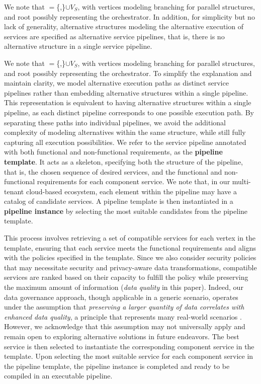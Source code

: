 \vspace{0.5em}

We note that \V$=$\{,\}$\cup$$V_S$, with vertices  modeling branching for parallel structures, and root  possibly representing the orchestrator. In addition, for simplicity but no lack of generality, alternative structures modeling the alternative execution of services are specified as alternative service pipelines, that is, there is no alternative structure in a single service pipeline.

\vspace{0.5em}
{\color{OurColor2}
We note that \V$=$\{,\}$\cup$$V_S$, with vertices  modeling branching for parallel structures, and root  possibly representing the orchestrator. To simplify the explanation and maintain clarity, we model alternative execution paths as distinct service pipelines rather than embedding alternative structures within a single pipeline. This representation is equivalent to having alternative structures within a single pipeline, as each distinct pipeline corresponds to one possible execution path. By separating these paths into individual pipelines, we avoid the additional complexity of modeling alternatives within the same structure, while still fully capturing all execution possibilities.
}
We refer to the service pipeline annotated with both functional and non-functional requirements, as the \textbf{pipeline template}. It acts as a skeleton, specifying both the structure of the pipeline, that is, the chosen sequence of desired services, and the functional and non-functional requirements for each component service. We note that, in our multi-tenant cloud-based ecosystem, each element within the pipeline may have a catalog of candidate services. A pipeline template is then instantiated in a \textbf{pipeline instance} by selecting the most suitable candidates from the pipeline template.

This process involves retrieving a set of compatible services for each vertex in the template, ensuring that each service meets the functional requirements and aligns with the policies specified in the template. Since we also consider security policies that may necessitate security and privacy-aware data transformations, compatible services are ranked based on their capacity to fulfill the policy while preserving the maximum amount of information (\emph{data quality} in this paper). Indeed, our data governance approach, though applicable in a generic scenario, operates under the assumption that \textit{preserving a larger quantity of data correlates with enhanced data quality}, {\color{OurColor2}a principle that represents many real-world scenarios \cite{PPDPasurvey,AlexInst2020}. }However, we acknowledge that this assumption may not universally apply and remain open to exploring alternative solutions in future endeavors.
%
The best service is then selected to instantiate the corresponding component service in the template.
Upon selecting the most suitable service for each component service in the pipeline template, the pipeline instance is completed and ready to be compiled in an executable pipeline.

